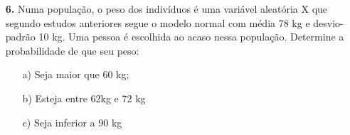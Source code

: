 \begin{itemize}
	\item[\textbf{6.}] Numa população, o peso dos indivíduos é uma variável aleatória X que segundo estudos anteriores segue o modelo normal com média 78 kg e desvio-padrão 10 kg. Uma pessoa é escolhida ao acaso nessa população. Determine a probabilidade de que seu peso:\\
		\begin{itemize}
		\item[a)] Seja maior que 60 kg;
		\item[b)] Esteja entre 62kg e 72 kg
		\item[c)] Seja inferior a 90 kg
\end{itemize}
\end{itemize}
